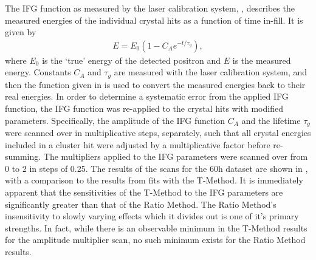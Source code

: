 The IFG function as measured by the laser calibration system, , describes the measured energies of the individual crystal hits as a function of time in-fill. It is given by \cite{IFG}
    \begin{align} \label{eq:IFG}
        E = E_{0}(1 - C_{A} e^{-t/\tau_{g}}),
    \end{align}
where $E_{0}$ is the `true' energy of the detected positron and $E$ is the measured energy. Constants $C_{A}$ and $\tau_{g}$ are measured with the laser calibration system, and then the function given in  is used to convert the measured energies back to their real energies. In order to determine a systematic error from the applied IFG function, the IFG function was re-applied to the crystal hits with modified parameters. Specifically, the amplitude of the IFG function $C_{A}$ and the lifetime $\tau_{g}$  were scanned over in multiplicative steps, separately, such that all crystal energies included in a cluster hit were adjusted by a multiplicative factor before re-summing. The multipliers applied to the IFG parameters were scanned over from 0 to 2 in steps of 0.25. The results of the scans for the 60h dataset are shown in , with a comparison to the results from fits with the T-Method. It is immediately apparent that the sensitivities of the T-Method to the IFG parameters are significantly greater than that of the Ratio Method. The Ratio Method's insensitivity to slowly varying effects which it divides out is one of it's primary strengths. In fact, while there is an observable minimum in the T-Method \chisq results for the amplitude multiplier scan, no such minimum exists for the Ratio Method results.




